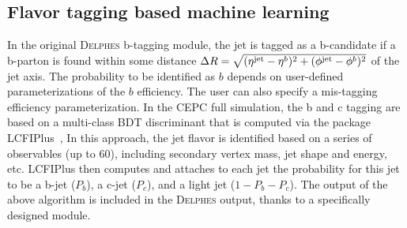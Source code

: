 \documentclass[a4paper,10pt,twoside]{cpc-hepnp}
\begin{document}
\begin{multicols}{2}
\section{Flavor tagging based machine learning\label{b-tagging}}

In the original {\textsc{Delphes}} b-tagging module, the jet is tagged as a b-candidate if a b-parton is found within
some distance $\Delta R = \sqrt{(\eta^{\mbox{\scriptsize jet}}-\eta^b)^2+(\phi^{\mbox{\scriptsize jet}}-\phi^b)^2}$ of the jet axis.
The probability to be identified as $b$ depends on user-defined parameterizations of the $b$ efficiency.
The user can also specify a mis-tagging efficiency parameterization.
In the CEPC full simulation, the b and c tagging are based on a multi-class BDT discriminant that is computed via the package LCFIPlus~\cite{ref:lcfiplus},
In this approach, the jet flavor is identified based on a series of observables (up to 60), including secondary vertex mass, jet shape and energy, etc.
LCFIPlus then computes and attaches to each jet the probability for this jet to be a b-jet ($P_b$), a c-jet ($P_c$), and a light jet ($1 - P_b - P_c$).
The output of the above algorithm is included in the {\textsc{Delphes}} output, thanks to a specifically designed module. %


\end{multicols}
\end{document}
